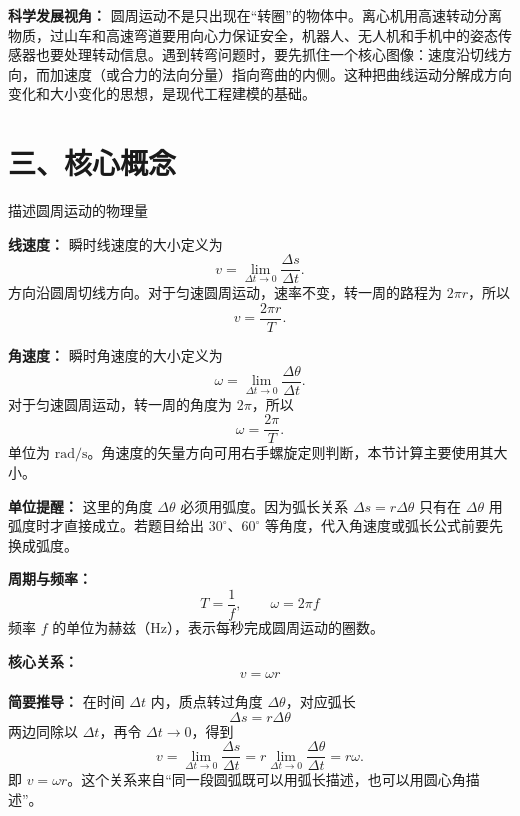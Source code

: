 \textbf{科学发展视角：} 圆周运动不是只出现在“转圈”的物体中。离心机用高速转动分离物质，过山车和高速弯道要用向心力保证安全，机器人、无人机和手机中的姿态传感器也要处理转动信息。遇到转弯问题时，要先抓住一个核心图像：速度沿切线方向，而加速度（或合力的法向分量）指向弯曲的内侧。这种把曲线运动分解成方向变化和大小变化的思想，是现代工程建模的基础。

\section*{三、核心概念}

\begin{conceptbox}{描述圆周运动的物理量}

\textbf{线速度：} 瞬时线速度的大小定义为
\[
v=\lim_{\Delta t\to0}\frac{\Delta s}{\Delta t}.
\]
方向沿圆周切线方向。对于匀速圆周运动，速率不变，转一周的路程为 $2\pi r$，所以
\[
v=\frac{2\pi r}{T}.
\]

\textbf{角速度：} 瞬时角速度的大小定义为
\[
\omega=\lim_{\Delta t\to0}\frac{\Delta\theta}{\Delta t}.
\]
对于匀速圆周运动，转一周的角度为 $2\pi$，所以
\[
\omega=\frac{2\pi}{T}.
\]
单位为 $\mathrm{rad/s}$。角速度的矢量方向可用右手螺旋定则判断，本节计算主要使用其大小。

\textbf{单位提醒：} 这里的角度 $\Delta\theta$ 必须用弧度。因为弧长关系 $\Delta s=r\Delta\theta$ 只有在 $\Delta\theta$ 用弧度时才直接成立。若题目给出 $30^\circ$、$60^\circ$ 等角度，代入角速度或弧长公式前要先换成弧度。

\textbf{周期与频率：}
\[
T = \frac{1}{f},\qquad \omega = 2\pi f
\]
频率 $f$ 的单位为赫兹（$\mathrm{Hz}$），表示每秒完成圆周运动的圈数。

\textbf{核心关系：}
\[
\boxed{v = \omega r}
\]

\textbf{简要推导：} 在时间 $\Delta t$ 内，质点转过角度 $\Delta\theta$，对应弧长
\[
\Delta s=r\Delta\theta
\]
两边同除以 $\Delta t$，再令 $\Delta t\to0$，得到
\[
v=\lim_{\Delta t\to0}\frac{\Delta s}{\Delta t}
=r\lim_{\Delta t\to0}\frac{\Delta\theta}{\Delta t}
=r\omega.
\]
即 $v=\omega r$。这个关系来自“同一段圆弧既可以用弧长描述，也可以用圆心角描述”。

\begin{center}


\label{fig:circular-motion}
\end{center}

\end{conceptbox}

